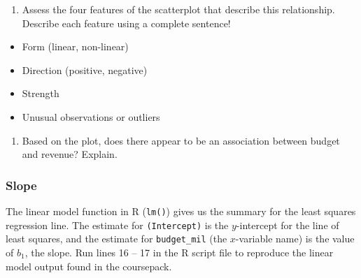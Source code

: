 \documentclass[
]{report}
\providecommand{\tightlist}{%
  \setlength{\itemsep}{0pt}\setlength{\parskip}{0pt}}
\begin{document}
\vspace{2in}

\begin{enumerate}
\def\labelenumi{\arabic{enumi}.}
\setcounter{enumi}{1}
\tightlist
\item
  Assess the four features of the scatterplot that describe this relationship. Describe each feature using a complete sentence!
\end{enumerate}

\begin{itemize}
\tightlist
\item
  Form (linear, non-linear)
\end{itemize}

\vspace{.2in}

\begin{itemize}
\tightlist
\item
  Direction (positive, negative)
\end{itemize}

\vspace{.2in}

\begin{itemize}
\tightlist
\item
  Strength
\end{itemize}

\vspace{.2in}

\begin{itemize}
\tightlist
\item
  Unusual observations or outliers
\end{itemize}

\vspace{.2in}

\begin{enumerate}
\def\labelenumi{\arabic{enumi}.}
\setcounter{enumi}{2}
\tightlist
\item
  Based on the plot, does there appear to be an association between budget and revenue? Explain.
\end{enumerate}

\vspace{1in}

\hypertarget{slope}{%
\subsubsection*{Slope}\label{slope}}

The linear model function in R (\texttt{lm()}) gives us the summary for the least squares regression line. The estimate for \texttt{(Intercept)} is the \(y\)-intercept for the line of least squares, and the estimate for \texttt{budget\_mil} (the \(x\)-variable name) is the value of \(b_1\), the slope. Run lines 16 -- 17 in the R script file to reproduce the linear model output found in the coursepack.
\end{document}
